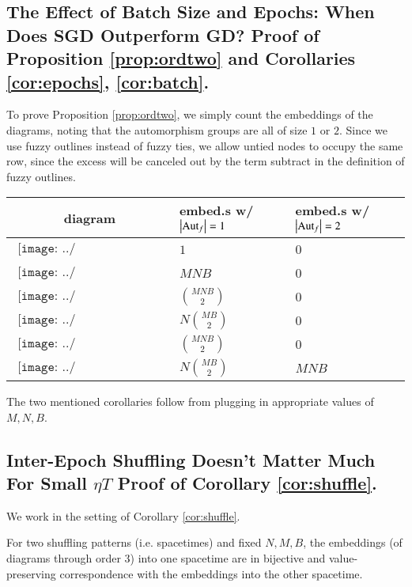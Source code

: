 \documentclass{article}
\theoremstyle{plain}
\theoremstyle{definition}
\newcommand{\Aut}{\text{\textnormal{Aut}}}
\newcommand{\wabs}[1]{\left|#1\right|}
\newcommand{\sdia}[1]{\begin{gathered}\texttt{[image: ../diagrams/\#1.png]}\end{gathered}}
\begin{document}
    \subsection{
        The Effect of Batch Size and Epochs:
        When Does SGD Outperform GD?
        Proof of Proposition \ref{prop:ordtwo} and
        Corollaries \ref{cor:epochs}, \ref{cor:batch}.
    }
        To prove Proposition \ref{prop:ordtwo}, we simply count
        the embeddings of the diagrams, noting that the automorphism groups
        are all of size $1$ or $2$.  Since we use fuzzy outlines instead of
        fuzzy ties, we allow untied nodes to occupy the same row, since the
        excess will be canceled out by the term subtract in the definition of
        fuzzy outlines.
        \begin{tabular}{cll}
            diagram                 & embed.s w/ $\wabs{\Aut_f}=1$  & embed.s w/ $\wabs{\Aut_f}=2$   \\ \hline
            $\sdia{(0)()}$          & $1$                           & $0$                            \\  
            $\sdia{(0-1)(01)}$      & $MNB$                         & $0$                            \\                  
            $\sdia{(0-1-2)(01-12)}$ & ${MNB\choose 2}$              & $0$                            \\
            $\sdia{c(01-2)(01-12)}$ & $N{MB\choose 2}$              & $0$                            \\
            $\sdia{(0-1-2)(02-12)}$ & ${MNB\choose 2}$              & $0$                            \\
            $\sdia{c(01-2)(02-12)}$ & $N{MB\choose 2}$              & $MNB$                             
        \end{tabular}

        The two mentioned corollaries follow from plugging in appropriate
        values of $M, N, B$.

    \subsection{
        Inter-Epoch Shuffling Doesn't Matter Much For Small $\eta T$
        Proof of Corollary \ref{cor:shuffle}.
    }
        We work in the setting of Corollary \ref{cor:shuffle}.
        
        For two shuffling patterns (i.e. spacetimes) and fixed $N, M, B$, the
        embeddings (of diagrams through order $3$) into one spacetime are in
        bijective and value-preserving correspondence with the embeddings into
        the other spacetime.
\end{document}
